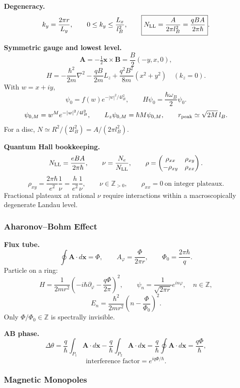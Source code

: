 \noindent\textbf{Degeneracy.}
\[
k_y=\frac{2\pi r}{L_y},\qquad
0\le k_y\le \frac{L_x}{l_B^2},\qquad
\boxed{N_{\rm LL}=\frac{A}{2\pi l_B^2}=\frac{qBA}{2\pi\hbar}}.
\]

\noindent\textbf{Symmetric gauge and lowest level.}
\[
\mathbf A=-\tfrac12\mathbf x\times\mathbf B=\frac{B}{2}(-y,x,0),
\]
\[
H=-\frac{\hbar^2}{2m}\nabla^2-\frac{qB}{2m}L_z
+\frac{q^2B^2}{8m}(x^2+y^2)\quad(k_z=0).
\]
With $w=x+iy$,
\[
\psi_0=f(w)e^{-|w|^2/4l_B^2},\qquad
H\psi_0=\frac{\hbar\omega_B}{2}\psi_0.
\]
\[
\psi_{0,M}=w^Me^{-|w|^2/4l_B^2},\qquad
L_z\psi_{0,M}=\hbar M\psi_{0,M},\qquad
r_{\rm peak}\simeq \sqrt{2M}\,l_B.
\]
For a disc, $N\simeq R^2/(2l_B^2)=A/(2\pi l_B^2)$.

\noindent\textbf{Quantum Hall bookkeeping.}
\[
N_{\rm LL}=\frac{eBA}{2\pi\hbar},\qquad
\nu=\frac{N_e}{N_{\rm LL}},\qquad
\rho=\begin{pmatrix}\rho_{xx}&\rho_{xy}\\-\rho_{xy}&\rho_{xx}\end{pmatrix}.
\]
\[
\boxed{\rho_{xy}=\frac{2\pi\hbar}{e^2}\frac1\nu
=\frac{h}{e^2}\frac1\nu,\qquad \nu\in\mathbb Z_{>0},\qquad
\rho_{xx}=0\ \text{on integer plateaux}.}
\]
Fractional plateaux at rational $\nu$ require interactions within a macroscopically
degenerate Landau level. 

\subsubsection*{Aharonov--Bohm Effect}

\noindent\textbf{Flux tube.}
\[
\oint\mathbf A\cdot d\mathbf x=\Phi,\qquad
A_\varphi=\frac{\Phi}{2\pi r},\qquad \Phi_0=\frac{2\pi\hbar}{q}.
\]
Particle on a ring:
\[
H=\frac{1}{2mr^2}\left(-i\hbar\partial_\varphi-\frac{q\Phi}{2\pi}\right)^2,
\qquad
\psi_n=\frac{1}{\sqrt{2\pi r}}e^{in\varphi},\quad n\in\mathbb Z,
\]
\[
\boxed{E_n=\frac{\hbar^2}{2mr^2}\left(n-\frac{\Phi}{\Phi_0}\right)^2}.
\]
Only $\Phi/\Phi_0\in\mathbb Z$ is spectrally invisible.

\noindent\textbf{AB phase.}
\[
\Delta\theta
=\frac{q}{\hbar}\int_{P_1}\mathbf A\cdot d\mathbf x
-\frac{q}{\hbar}\int_{P_2}\mathbf A\cdot d\mathbf x
=\frac{q}{\hbar}\oint\mathbf A\cdot d\mathbf x
=\frac{q\Phi}{\hbar},
\]
\[
\boxed{\text{interference factor}=e^{iq\Phi/\hbar}}.
\]

\subsubsection*{Magnetic Monopoles}

